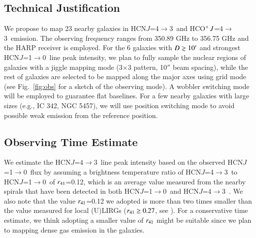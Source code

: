 \documentclass[legal,11pt]{article}
\def\arcmin {\hbox{$^{\prime}$}}
\def\,{\thinspace}
\def\HCNoz      {HCN\,$J$=1$\rightarrow$0}
\def\HCNft        {HCN\,$J$=4$\rightarrow$3}
\def\HCOPft     {HCO$^+\,J$=4$\rightarrow$3}
\begin{document}
\subsection{Technical Justification}

We propose to map 23 nearby galaxies in \HCNft\ and \HCOPft\  emission. The
observing frequency ranges from 350.89 GHz to 356.75 GHz and the HARP receiver
is employed. For the 6 galaxies with $D\gtrsim 10\arcmin$ and strongest
\HCNoz\ line peak intensity, we plan to fully sample the nuclear regions of
galaxies with a jiggle mapping mode (3$\times$3 pattern, 10$''$ beam spacing),
while the rest of galaxies are selected to be mapped along the major axes using
grid mode (see Fig.~\ref{fig:obs} for a sketch of the observing mode). A
wobbler switching mode will be employed to guarantee flat baselines. For a few
nearby galaxies with large sizes (e.g., IC 342, NGC 5457), we will use position
switching mode to avoid possible weak emission from the reference position.

\subsection{Observing Time Estimate}

We estimate the \HCNft\  line peak intensity based on the observed \HCNoz\ 
flux by assuming a brightness temperature ratio of \HCNft\ to \HCNoz\  of
$r_{\rm 41}$=0.12, which is an average value measured from the nearby spirals
that have been detected in both \HCNoz\ and \HCNft\ \citep[][note that the
beam size of HCN $J$=1-0 observations is generally larger than HCN $J$=4-3 and
thus here we might underestimate the value of $r_{\rm 41}$]{gs04a,zgh2014}. We
also note that the value $r_{\rm 41}$=0.12 we adopted is more than two times
smaller than the value measured for local (U)LIRGs ($r_{\rm 41}\geq 0.27$, see
\citealt{PPP2007}). For a conservative time estimate, we think adopting a
smaller value of $r_{\rm 41}$ might be suitable since we plan to mapping dense
gas emission in the galaxies. 
\end{document}
